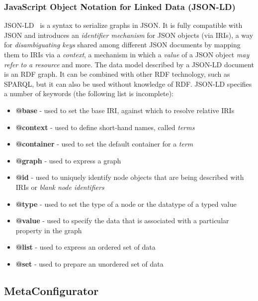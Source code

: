 \subsubsection{JavaScript Object Notation for Linked Data (JSON-LD)}
JSON-LD~\cite{json-ld} is a syntax to serialize graphs in JSON. 
It is fully compatible with JSON and introduces an \textit{identifier mechanism} for JSON objects  (via IRIs), a way for \textit{disambiguating keys} shared among different JSON documents by mapping them to IRIs via a \textit{context}, a mechanism in which a \textit{value} of a JSON object \textit{may refer to a resource} and more.
The data model described by a JSON-LD document is an RDF graph. 
It can be combined with other RDF technology, such as SPARQL, but it can also be used without knowledge of RDF.
JSON-LD specifies a number of keywords (the following list is incomplete):
\begin{itemize}
	\item \textbf{@base} - used to set the base IRI, against which to resolve relative IRIs
	\item \textbf{@context} - used to define short-hand names, called \textit{terms}
	\item \textbf{@container} - used to set the default container for a \textit{term}
	\item \textbf{@graph} - used to express a graph
	\item \textbf{@id} - used to uniquely identify node objects that are being described with IRIs or \textit{blank node identifiers}
	\item \textbf{@type} - used to set the type of a node or the datatype of a typed value
	\item \textbf{@value} - used to specify the data that is associated with a particular property in the graph
	\item \textbf{@list} - used to express an ordered set of data
	\item \textbf{@set} - used to prepare an unordered set of data
\end{itemize}


\subsection{MetaConfigurator}

